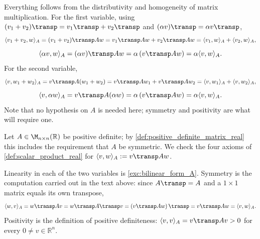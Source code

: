 \begin{exercisesolution}
\label{sol:bilinear_form_A}
  Everything follows from the distributivity and homogeneity of matrix multiplication. For the first variable, using $(v_1 + v_2)\transp = v_1\transp + v_2\transp$ and $(\alpha v)\transp = \alpha v\transp$,
  \[ \langle v_1 + v_2, w \rangle_A = (v_1 + v_2)\transp A w = v_1\transp A w + v_2\transp A w = \langle v_1, w \rangle_A + \langle v_2, w \rangle_A, \]
  \[ \langle \alpha v, w \rangle_A = (\alpha v)\transp A w = \alpha \left( v\transp A w \right) = \alpha \langle v, w \rangle_A. \]
  For the second variable,
  \[ \langle v, w_1 + w_2 \rangle_A = v\transp A (w_1 + w_2) = v\transp A w_1 + v\transp A w_2 = \langle v, w_1 \rangle_A + \langle v, w_2 \rangle_A, \]
  \[ \langle v, \alpha w \rangle_A = v\transp A (\alpha w) = \alpha \left( v\transp A w \right) = \alpha \langle v, w \rangle_A. \]
  Note that no hypothesis on $A$ is needed here; symmetry and positivity are what will require one.
\end{exercisesolution}

\begin{exercisesolution}
\label{sol:pos_def_gives_scalar_product}
  Let $A \in \M_{n \times n}(\mathbb{R})$ be positive definite; by \cref{def:positive_definite_matrix_real} this includes the requirement that $A$ be symmetric. We check the four axioms of \cref{def:scalar_product_real} for $\langle v, w \rangle_A := v\transp A w$.

  Linearity in each of the two variables is \cref{exc:bilinear_form_A}. Symmetry is the computation carried out in the text above: since $A\transp = A$ and a $1 \times 1$ matrix equals its own transpose,
  \[ \langle w, v \rangle_A = w\transp A v = w\transp A\transp v = \left( v\transp A w \right)\transp = v\transp A w = \langle v, w \rangle_A. \]
  Positivity is the definition of positive definiteness: $\langle v, v \rangle_A = v\transp A v > 0$ for every $0 \ne v \in \mathbb{R}^n$.
\end{exercisesolution}


